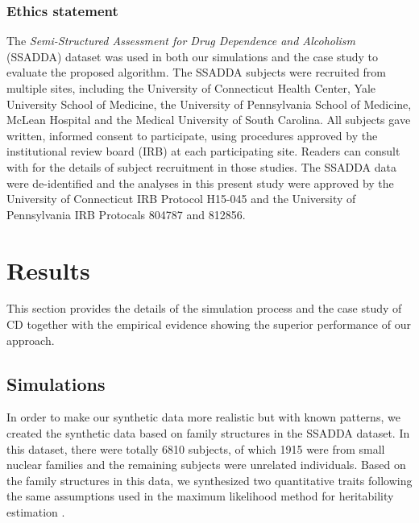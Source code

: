 \documentclass[10pt,letterpaper]{article}
\begin{document}
\subsubsection*{Ethics statement}
The {\em Semi-Structured Assessment for Drug Dependence and Alcoholism} (SSADDA) dataset \cite{Gelernter:CD:2014} was used in both our simulations and the case study to evaluate the proposed algorithm. The SSADDA subjects were recruited from multiple sites, including the University of Connecticut Health Center, Yale University School of Medicine, the University of Pennsylvania School of Medicine, McLean Hospital and the Medical University of South Carolina. All subjects gave written, informed consent to participate, using procedures approved by the institutional review board (IRB) at each participating site. Readers can consult with \cite{Gelernter:CD:2014} for the details of subject recruitment in those studies. The SSADDA data were de-identified and the analyses in this present study were approved by the University of Connecticut IRB Protocol H15-045 and the University of Pennsylvania IRB Protocals 804787 and 812856.


\section*{Results}
\label{sec:results}
This section provides the details of the simulation process and the case study of CD together with the empirical evidence showing the superior performance of our approach.

\subsection*{Simulations}
In order to make our synthetic data more realistic but with known patterns, we created the synthetic data based on family structures in the SSADDA dataset. In this dataset, there were totally 6810 subjects, of which 1915 were from small nuclear families and the remaining subjects were unrelated individuals. Based on the family structures in this data, we synthesized two quantitative traits following the same assumptions used in the maximum likelihood method for heritability estimation \cite{Lange1976}. 
\end{document}
